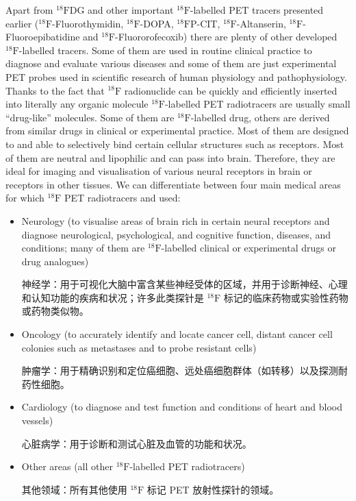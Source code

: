 \documentclass[dvipsnames, svgnames,a4paper,11pt]{article}
\begin{document}
Apart from ${}^\mathrm{18}\mathrm{F}$DG and other important ${}^\mathrm{18}\mathrm{F}$-labelled PET tracers presented earlier
(${}^\mathrm{18}\mathrm{F}$-Fluorothymidin, ${}^\mathrm{18}\mathrm{F}$-DOPA, ${}^\mathrm{18}\mathrm{F}$P-CIT, ${}^\mathrm{18}\mathrm{F}$-Altanserin, ${}^\mathrm{18}\mathrm{F}$-Fluoroepibatidine and
${}^\mathrm{18}\mathrm{F}$-Fluororofecoxib) there are plenty of other developed ${}^\mathrm{18}\mathrm{F}$-labelled tracers. Some
of them are used in routine clinical practice to diagnose and evaluate various
diseases and some of them are just experimental PET probes used in scientific
research of human physiology and pathophysiology. Thanks to the fact that ${}^\mathrm{18}\mathrm{F}$
radionuclide can be quickly and efficiently inserted into literally any organic molecule
${}^\mathrm{18}\mathrm{F}$-labelled PET radiotracers are usually small “drug-like” molecules. Some of them
are ${}^\mathrm{18}\mathrm{F}$-labelled drug, others are derived from similar drugs in clinical or experimental
practice. Most of them are designed to and able to selectively bind certain cellular
structures such as receptors. Most of them are neutral and lipophilic and can pass
into brain. Therefore, they are ideal for imaging and visualisation of various neural
receptors in brain or receptors in other tissues. We can differentiate between four
main medical areas for which ${}^\mathrm{18}\mathrm{F}$ PET radiotracers and used:

\begin{itemize}
      \item Neurology (to visualise areas of brain rich in certain neural receptors and diagnose neurological, psychological, and cognitive function, diseases, and conditions; many of them are ${}^\mathrm{18}\mathrm{F}$-labelled clinical or experimental drugs or drug analogues)
      
      神经学：用于可视化大脑中富含某些神经受体的区域，并用于诊断神经、心理和认知功能的疾病和状况；许多此类探针是 ${}^\mathrm{18}\mathrm{F}$ 标记的临床药物或实验性药物或药物类似物。

      \item Oncology (to accurately identify and locate cancer cell, distant cancer cell colonies such as metastases and to probe resistant cells)
      
      肿瘤学：用于精确识别和定位癌细胞、远处癌细胞群体（如转移）以及探测耐药性细胞。

      \item Cardiology (to diagnose and test function and conditions of heart and blood vessels)

      心脏病学：用于诊断和测试心脏及血管的功能和状况。

      \item Other areas (all other ${}^\mathrm{18}\mathrm{F}$-labelled PET radiotracers)
      
      其他领域：所有其他使用 ${}^\mathrm{18}\mathrm{F}$ 标记 PET 放射性探针的领域。
\end{itemize}
\end{document}
